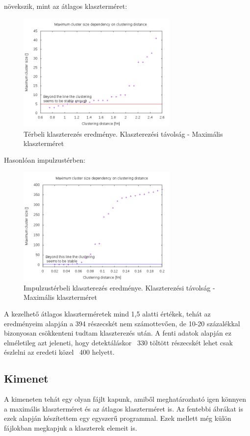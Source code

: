\documentclass[a4paper,12pt]{article}
\begin{document}
növekszik, mint az átlagos klaszterméret:
\begin{figure}[H]
	\centering
	\includegraphics[width=0.7\textwidth]{dist-max.png}
	\caption{ Térbeli klaszterezés eredménye. Klaszterezési távolság - Maximális klaszterméret }
\end{figure}
\par Hasonlóan impulzustérben:
\begin{figure}[H]
	\centering
	\includegraphics[width=0.7\textwidth]{momdist-max.png}
	\caption{ Impulzustérbeli klaszterezés eredménye. Klaszterezési távolság - Maximális klaszterméret }
\end{figure}
\par A kezelhető átlagos klaszterméretek mind 1,5 alatti értékek, tehát az eredményeim alapján a 394 részecskét nem számottevően, de 10-20 százalékkal
 bizonyosan csökkenteni tudtam klaszterezés után. A fenti adatok 
alapján ez elméletileg azt jeleneti, hogy detektáláskor ~330 töltött részecskét lehet csak észlelni az eredeti közel ~400 helyett. 
\subsection{ Kimenet}
\par A kimeneten tehát egy olyan fájlt kapunk, amiből meghatározható igen könnyen a maximális klaszterméret és az átlagos klaszterméret is.
Az fentebbi ábrákat is ezek alapján készítettem egy egyszerű programmal. Ezek mellett még külön fájlokban megkapjuk a klaszterek elemeit is.
\end{document}
